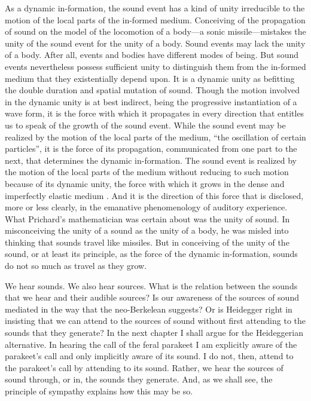 As a dynamic in-formation, the sound event has a kind of unity irreducible to the motion of the local parts of the in-formed medium. Conceiving of the propagation of sound on the model of the locomotion of a body---a sonic missile---mistakes the unity of the sound event for the unity of a body. Sound events may lack the unity of a body. After all, events and bodies have different modes of being. But sound events nevertheless possess sufficient unity to distinguish them from the in-formed medium that they existentially depend upon. It is a dynamic unity as befitting the double duration and spatial mutation of sound. Though the motion involved in the dynamic unity is at best indirect, being the progressive instantiation of a wave form, it is the force with which it propagates in every direction that entitles us to speak of the growth of the sound event.  While the sound event may be realized by the motion of the local parts of the medium, ``the oscillation of certain particles'', it is the force of its propagation, communicated from one part to the next, that determines the dynamic in-formation. The sound event is realized by the motion of the local parts of the medium without reducing to such motion because of its dynamic unity, the force with which it grows in the dense and imperfectly elastic medium \citep[on dynamic principles of unity see][]{Johnston:2006js}. And it is the direction of this force that is disclosed, more or less clearly, in the emanative phenomenology of auditory experience. What Prichard's mathematician was certain about was the unity of sound. In misconceiving the unity of a sound as the unity of a body, he was misled into thinking that sounds travel like missiles. But in conceiving of the unity of the sound, or at least its principle, as the force of the dynamic in-formation, sounds do not so much as travel as they grow.

We hear sounds. We also hear sources. What is the relation between the sounds that we hear and their audible sources? Is our awareness of the sources of sound mediated in the way that the neo-Berkelean suggests? Or is Heidegger right in insisting that we can attend to the sources of sound without first attending to the sounds that they generate? In the next chapter I shall argue for the Heideggerian alternative. In hearing the call of the feral parakeet I am explicitly aware of the parakeet's call and only implicitly aware of its sound. I do not, then, attend to the parakeet's call by attending to its sound. Rather, we hear the sources of sound through, or in, the sounds they generate. And, as we shall see, the principle of sympathy explains how this may be so.


